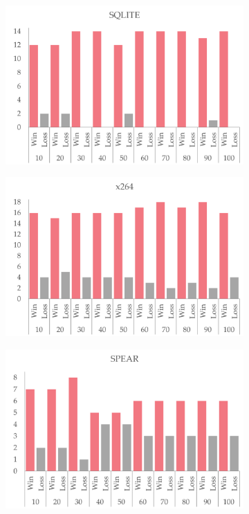 \begin{figure}[t]
	\centering
\begin{subfigure}[t]{0.33\linewidth}
		\centering
		\includegraphics[width=\linewidth]{figures/sqlite_rq2.png}
\end{subfigure}%
\begin{subfigure}[t]{0.33\linewidth}
		\centering
		\includegraphics[width=\linewidth]{figures/x264_rq2.png}
\end{subfigure}%
\begin{subfigure}[t]{0.33\linewidth}
		\centering
		\includegraphics[width=\linewidth]{figures/spear_rq2.png}

\end{subfigure}
\end{figure}
